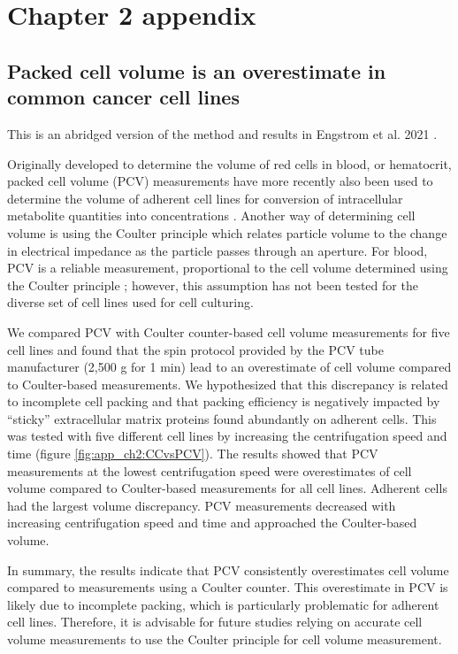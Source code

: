 \chapter{Chapter 2 appendix}
\section{Packed cell volume is an overestimate in common cancer cell lines}
\label{app_ch2_cell_vol}
This is an abridged version of the method and results in Engstrom et al. 2021 \cite{Engstrom2021-az}.

Originally developed to determine the volume of red cells in blood, or hematocrit, packed cell volume (PCV) measurements have more recently also been used to determine the volume of adherent cell lines for conversion of intracellular metabolite quantities into concentrations \cite{Park2016-ap, Liu2018-it, Yang2020-fs, Ghergurovich2020-nb}.
Another way of determining cell volume is using the Coulter principle which relates particle volume to the change in electrical impedance as the particle passes through an aperture.
For blood, PCV is a reliable measurement, proportional to the cell volume determined using the Coulter principle \cite{Carter1968-xy, Bull2001-xb}; however, this assumption has not been tested for the diverse set of cell lines used for cell culturing.

We compared PCV with Coulter counter-based cell volume measurements for five cell lines and found that the spin protocol provided by the PCV tube manufacturer (2,500 g for 1 min) lead to an overestimate of cell volume compared to Coulter-based measurements.
We hypothesized that this discrepancy is related to incomplete cell packing and that packing efficiency is negatively impacted by ``sticky'' extracellular matrix proteins found abundantly on adherent cells.
This was tested with five different cell lines by increasing the centrifugation speed and time (figure \ref{fig:app_ch2:CCvsPCV}).
The results showed that PCV measurements at the lowest centrifugation speed were overestimates of cell volume compared to Coulter-based measurements for all cell lines.
Adherent cells had the largest volume discrepancy.
PCV measurements decreased with increasing centrifugation speed and time and approached the Coulter-based volume.

In summary, the results indicate that PCV consistently overestimates cell volume compared to measurements using a Coulter counter.
This overestimate in PCV is likely due to incomplete packing, which is particularly problematic for adherent cell lines.
Therefore, it is advisable for future studies relying on accurate cell volume measurements to use the Coulter principle for cell volume measurement.

